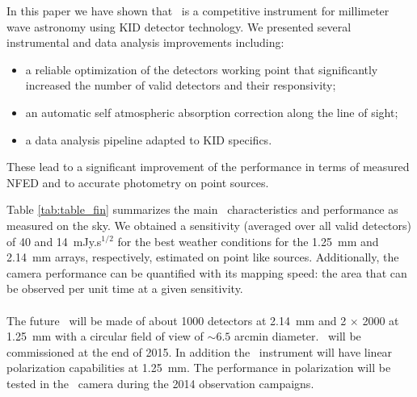 In this paper we have shown that \NIKA\ is a competitive instrument for
millimeter wave astronomy using KID detector technology.
We presented several instrumental and data analysis improvements including:
\begin{itemize}
\item a reliable optimization of the detectors working point that significantly increased the number of valid detectors and their responsivity;
\item an automatic self atmospheric absorption correction along the line of sight;
\item a data analysis pipeline adapted to KID specifics. 
\end{itemize}
These lead to a significant improvement of the performance in terms of measured NFED
and to accurate photometry on point sources.

Table \ref{tab:table_fin} summarizes the main \NIKA\ 
characteristics and performance as measured on the sky. We obtained a 
sensitivity (averaged over all valid detectors) of 40 and 14~mJy.s$^{1/2}$
for the best weather conditions for the 1.25~mm and 2.14~mm arrays, respectively,
estimated on point like sources.
Additionally, the camera performance 
can be quantified with its mapping speed: the area that can be observed per unit time at a given sensitivity.    
\\
\\
The future \NIKAii\ will be made of about 1000 detectors at 2.14~mm and 2 $\times$ 2000 at
1.25~mm with a circular field of view of $\sim 6.5$ arcmin diameter. \NIKAii\
will be commissioned at the end of 2015. In addition the \NIKAii\ instrument
will have linear polarization capabilities at 1.25~mm. The performance in
polarization will be tested in the \NIKA\ camera during the 2014 observation
campaigns.

